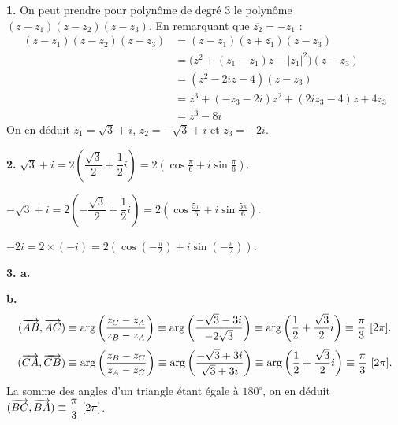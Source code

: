 \documentclass[11pt]{article}
\begin{document}
\textbf{1.} On peut prendre pour polynôme de degré 3 le polynôme $(z - z_1)(z - z_2)(z - z_3)$. En remarquant que $\overline{z_2} = -z_1$ :
\begin{align*}
(z - z_1)(z - z_2)(z - z_3) &= (z - z_1)(z + \overline{z_1})(z - z_3) \\
&= \big(z^2 + (\overline{z_1} - z_1)z - |z_1|^2\big)(z - z_3) \\
&= (z^2 - 2iz - 4)(z - z_3) \\
&= z^3 + (-z_3 - 2i)z^2 + (2iz_3 - 4)z + 4z_3 \\
&= z^3 - 8i
\end{align*}
On en déduit $z_1 = \sqrt{3} + i$, $z_2 = -\sqrt{3} + i$ et $z_3 = -2i$.

\textbf{2.} $\sqrt{3} + i = 2\left(\dfrac{\sqrt{3}}{2} + \dfrac{1}{2}i\right) = 2\left(\cos\tfrac{\pi}{6} + i\sin\tfrac{\pi}{6}\right)$.

$-\sqrt{3} + i = 2\left(-\dfrac{\sqrt{3}}{2} + \dfrac{1}{2}i\right) = 2\left(\cos\tfrac{5\pi}{6} + i\sin\tfrac{5\pi}{6}\right)$.

$-2i = 2 \times (-i) = 2\left(\cos\left(-\tfrac{\pi}{2}\right) + i\sin\left(-\tfrac{\pi}{2}\right)\right)$.

\textbf{3. a.}
\begin{center}
\end{center}

\textbf{b.}
\[ (\vv{AB}, \vv{AC}) \equiv \arg\left(\frac{z_C - z_A}{z_B - z_A}\right) \equiv \arg\left(\frac{-\sqrt{3} - 3i}{-2\sqrt{3}}\right) \equiv \arg\left(\frac{1}{2} + \frac{\sqrt{3}}{2}i\right) \equiv \frac{\pi}{3}\ [2\pi]. \]
\[ (\vv{CA}, \vv{CB}) \equiv \arg\left(\frac{z_B - z_C}{z_A - z_C}\right) \equiv \arg\left(\frac{-\sqrt{3} + 3i}{\sqrt{3} + 3i}\right) \equiv \arg\left(\frac{1}{2} + \frac{\sqrt{3}}{2}i\right) \equiv \frac{\pi}{3}\ [2\pi]. \]
La somme des angles d'un triangle étant égale à $180^\circ$, on en déduit $(\overrightarrow{BC}, \overrightarrow{BA}) \equiv \dfrac{\pi}{3}\ [2\pi]$.
\end{document}
